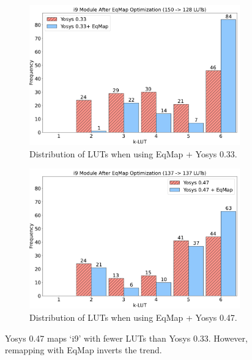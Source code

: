\begin{figure}
    \begin{subfigure}{0.47\textwidth}
        \centering
        \includegraphics[width=\textwidth]{img/y33.pdf}
        \caption{Distribution of LUTs when using EqMap + Yosys 0.33.}\label{fig:histogram:y33}
    \end{subfigure}
    \hfill\vspace{4mm}
    \begin{subfigure}{0.47\textwidth}
        \centering
        \includegraphics[width=\textwidth]{img/y47.pdf}
        \caption{Distribution of LUTs when using EqMap + Yosys 0.47.}\label{fig:histogram:y47}
    \end{subfigure}
    \caption{Yosys 0.47 maps `i9' with fewer LUTs than Yosys 0.33. However, remapping with EqMap inverts the trend.}\label{fig:histogram}
    \vspace{-0.5mm}
\end{figure}


